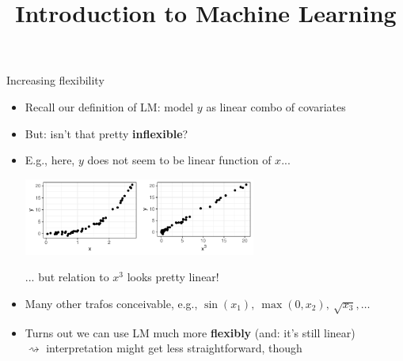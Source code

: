 \documentclass[11pt,compress,t,notes=noshow, xcolor=table]{beamer}
\title{Introduction to Machine Learning}
\institute{\href{https://compstat-lmu.github.io/lecture_i2ml/}{compstat-lmu.github.io/lecture\_i2ml}}
\date{}
\begin{document}


\begin{vbframe}{Increasing flexibility}

\begin{itemize}
    \item Recall our definition of LM: model $y$ as linear combo of covariates
    \item But: isn't that pretty \textbf{inflexible}?
    \item E.g., here, $y$ does not seem to be linear function of $x$... 

    \vspace{0.5cm}
    \includegraphics[width=0.6\textwidth]{figure/reg_poly_yx3.pdf} 
    
    ... but relation to $x^3$ looks pretty linear!
    
    \item Many other trafos conceivable, e.g., 
    $\sin(x_1), ~ \max(0, x_2), ~ \sqrt{x_3}, \dots$
    \item Turns out we can use LM much more 
    \textbf{flexibly} (and: it's still linear) \\
    $\rightsquigarrow$ interpretation might get less straightforward, though
\end{itemize}

\end{vbframe}

\end{document}
